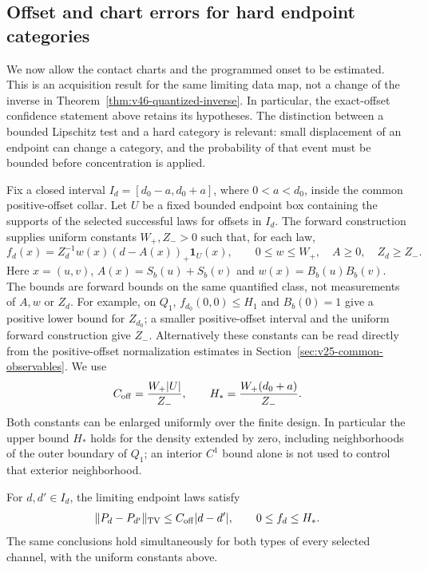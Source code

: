 \subsection{Offset and chart errors for hard endpoint categories}
\label{subsec:v47-calibration}

We now allow the contact charts and the programmed onset to be estimated.
This is an acquisition result for the same limiting data map, not a change
of the inverse in Theorem~\ref{thm:v46-quantized-inverse}.  In particular,
the exact-offset confidence statement above retains its hypotheses.
The distinction between a bounded Lipschitz test and a hard category is
relevant: small displacement of an endpoint can change a category, and the
probability of that event must be bounded before concentration is applied.

Fix a closed interval $I_d=[d_0-a,d_0+a]$, where $0<a<d_0$, inside the
common positive-offset collar.  Let $U$ be a fixed bounded endpoint box
containing the supports of the selected successful laws for offsets in
$I_d$.  The forward construction supplies uniform constants
$W_+,Z_->0$ such that, for each law,
\begin{equation}\label{eq:v47-forward-density}
 f_d(x)=Z_d^{-1}w(x)(d-A(x))_+\mathbf1_U(x),\qquad
 0\le w\le W_+,\quad A\ge0,\quad Z_d\ge Z_-.
\end{equation}
Here $x=(u,v)$, $A(x)=S_b(u)+S_b(v)$ and
$w(x)=B_b(u)B_b(v)$.  The bounds are forward bounds on the same quantified
class, not measurements of $A,w$ or $Z_d$.  For example, on $Q_1$,
$f_{d_0}(0,0)\le H_1$ and $B_b(0)=1$ give a positive lower bound for
$Z_{d_0}$; a smaller positive-offset interval and the uniform forward
construction give $Z_-$.  Alternatively these constants can be read
directly from the positive-offset normalization estimates in
Section~\ref{sec:v25-common-observables}.  We use
\[
 C_{\rm off}=\frac{W_+|U|}{Z_-},\qquad
 H_* = \frac{W_+(d_0+a)}{Z_-}.
\]
Both constants can be enlarged uniformly over the finite design.  In
particular the upper bound $H_*$ holds for the density extended by zero,
including neighborhoods of the outer boundary of $Q_1$; an interior
$C^1$ bound alone is not used to control that exterior neighborhood.

\begin{lemma}\label{lem:v47-offset}
For $d,d'\in I_d$, the limiting endpoint laws satisfy
\begin{equation}\label{eq:v47-offset-TV}
 \|P_d-P_{d'}\|_{\rm TV}\le C_{\rm off}|d-d'|,
 \qquad 0\le f_d\le H_*.
\end{equation}
The same conclusions hold simultaneously for both types of every selected
channel, with the uniform constants above.
\end{lemma}

